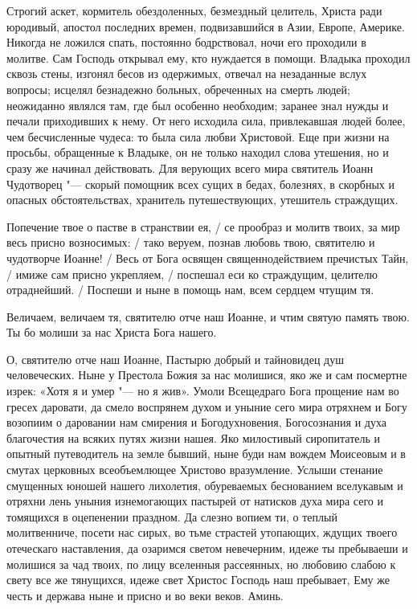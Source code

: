 \begin{mymulticols}




Строгий аскет, кормитель обездоленных, безмездный целитель, Христа ради юродивый, апостол последних времен, подвизавшийся в Азии, Европе, Америке. Никогда не ложился спать, постоянно бодрствовал, ночи его проходили в молитве. Сам Господь открывал ему, кто нуждается в помощи. Владыка проходил сквозь стены, изгонял бесов из одержимых, отвечал на незаданные вслух вопросы; исцелял безнадежно больных, обреченных на смерть людей; неожиданно являлся там, где был особенно необходим; заранее знал нужды и печали приходивших к нему. От него исходила сила, привлекавшая людей более, чем бесчисленные чудеса: то была сила любви Христовой. Еще при жизни на просьбы, обращенные к Владыке, он не только находил слова утешения, но и сразу же начинал действовать. Для верующих всего мира святитель Иоанн Чудотворец "--- скорый помощник всех сущих в бедах, болезнях, в скорбных и опасных обстоятельствах, хранитель путешествующих, утешитель страждущих.




Попечение твое о пастве в странствии ея, / се прообраз и молитв твоих, за мир весь присно возносимых: / тако веруем, познав любовь твою, святителю и чудотворче Иоанне! / Весь от Бога освящен священнодействием пречистых Тайн, / имиже сам присно укрепляем, / поспешал еси ко страждущим, целителю отраднейший. / Поспеши и ныне в помощь нам, всем сердцем чтущим тя.




Величаем, величаем тя, святителю отче наш Иоанне, и чтим святую память твою. Ты бо молиши за нас Христа Бога нашего.




О, святителю отче наш Иоанне, Пастырю добрый и тайновидец душ человеческих. Ныне у Престола Божия за нас молишися, яко же и сам посмертне изрек: «Хотя я и умер "--- но я жив». Умоли Всещедраго Бога прощение нам во гресех даровати, да смело воспрянем духом и уныние сего мира отряхнем и Богу возопиим о даровании нам смирения и Богодухновения, Богосознания и духа благочестия на всяких путях жизни нашея. Яко милостивый сиропитатель и опытный путеводитель на земле бывший, ныне буди нам вождем Моисеовым и в смутах церковных всеобъемлющее Христово вразумление. Услыши стенание смущенных юношей нашего лихолетия, обуреваемых беснованием вселукавым и отряхни лень уныния изнемогающих пастырей от натисков духа мира сего и томящихся в оцепенении праздном. Да слезно вопием ти, о теплый молитвенниче, посети нас сирых, во тьме страстей утопающих, ждущих твоего отеческаго наставления, да озаримся светом невечерним, идеже ты пребываеши и молишися за чад твоих, по лицу вселенныя рассеянных, но любовию слабою к свету все же тянущихся, идеже свет Христос Господь наш пребывает, Ему же честь и держава ныне и присно и во веки веков. Аминь.

\end{mymulticols}

\mychapterending

